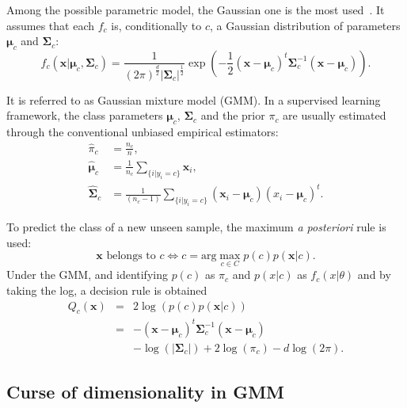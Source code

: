 \documentclass[journal,peerreview,onecolumn]{IEEEtran}
\begin{document}
    Among the possible parametric model,  the Gaussian one is the most
    used~\cite{bouveyron2014model}.   It assumes  that each  $f_c$ is,
    conditionally  to  $c$,  a  Gaussian  distribution  of  parameters
    $\boldsymbol{\mu}_c$    and    $\boldsymbol{\Sigma}_c$:
    \begin{equation*}
        f_c(\mathbf{x}|\boldsymbol{\mu}_c, \boldsymbol{\Sigma}_c) = \frac{1}{(2\pi)^{\frac{d}{2}} |\boldsymbol{\Sigma}_c|^{\frac{1}{2}}} \exp \left( -\frac{1}{2} (\mathbf{x} - \boldsymbol{\mu}_c)^t \boldsymbol{\Sigma}_c^{-1} (\mathbf{x} - \boldsymbol{\mu}_c) \right).
    \end{equation*}

    It  is  referred  to  as  Gaussian  mixture  model  (GMM).   In  a
    supervised    learning    framework,    the    class    parameters
    $\boldsymbol{\mu}_c$,   $\boldsymbol{\Sigma}_c$   and  the   prior
    $\pi_c$ are  usually estimated  through the  conventional unbiased
    empirical estimators:
    \begin{align}
        \hat{\pi}_c &= \frac{n_c}{n},\\
        \hat{\boldsymbol{\mu}}_c &= \frac{1}{n_c} \sum_{\{i|y_i = c\}} \mathbf{x}_i ,\\
        \hat{\boldsymbol{\Sigma}}_c &= \frac{1}{(n_c - 1)} \sum_{\{i|y_i = c\}} (\mathbf{x}_i - \boldsymbol{\mu}_c) (\boldsymbol{}x_i - \boldsymbol{\mu}_c)^t.
    \end{align}

    To predict the  class of a new unseen sample,  the maximum \emph{a
      posteriori}  rule  is  used:
    \begin{equation*}
        \mathbf{x} \text{ belongs to } c \Leftrightarrow c = \text{arg} \max_{c \in C} p(c) p(\mathbf{x}|c).
    \end{equation*}
    Under the GMM,  and identifying $p(c)$ as $\pi_c$  and $p(x|c)$ as
    $f_c(x|\theta)$ and by taking the log, a decision rule is obtained
    \begin{eqnarray}\label{eq:decision}
      Q_c(\mathbf{x}) &=& 2 \log \left( p(c) p(\mathbf{x}|c) \right) \nonumber \\
                      &=& - (\mathbf{x} - \boldsymbol{\mu}_c)^t \boldsymbol{\Sigma}_c^{-1} (\mathbf{x} - \boldsymbol{\mu}_c) \nonumber \\
                      & &-\log (|\boldsymbol{\Sigma}_c|) + 2 \log (\pi_c) - d \log (2\pi).
    \end{eqnarray}

    \subsection{Curse of dimensionality in GMM}
    \label{sec:curse:gmm}
    
\end{document}
